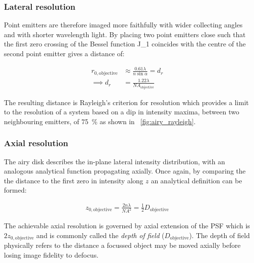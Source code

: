 \subsubsection{Lateral resolution}

Point emitters are therefore imaged more faithfully with wider collecting angles and with shorter wavelength light.
By placing two point emitters close such that the first zero crossing of the Bessel function \gls{J_1} coincides with the centre of the second point emitter gives a distance of:

\begin{align}
    r_{0,\text{objective}} &\approx \frac{0.61\lambda}{n\sin\alpha} = d_r \label{eq:lateral_res}\\
    \implies d_r &= \frac{1.22 \lambda}{NA_{\text{objective}}}
\end{align}

The resulting distance is Rayleigh's criterion for resolution which provides a limit to the resolution of a system based on a dip in intensity maxima, between two neighbouring emitters, of \SI{75}{\percent} as shown in \figurename~\ref{fig:airy_rayleigh}.

\subsubsection{Axial resolution}

The \Gls{airy disk} describes the in-plane lateral intensity distribution, with an analogous analytical function propagating axially.
Once again, by comparing the the distance to the first zero in intensity along $z$ an analytical definition can be formed:

\begin{align}
    z_{0,\text{objective}} = \frac{2n\lambda}{{NA}^2} \label{eq:axial_res} = \frac{1}{2} D_{\text{objective}}
\end{align}

The achievable axial resolution is governed by axial extension of the \gls{PSF} which is $2z_{0,\text{objective}}$ and is commonly called the \emph{\gls{depth of field}} ($D_{\text{objective}}$).
The \gls{depth of field} physically refers to the distance a focussed object may be moved axially before losing image fidelity to defocus.

